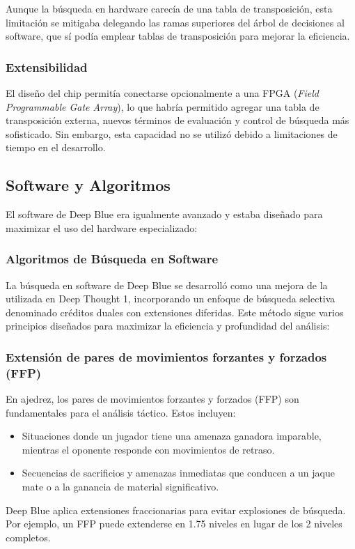 \documentclass[12pt,a4paper]{article}
\begin{document}
Aunque la búsqueda en hardware carecía de una tabla de transposición, esta limitación se mitigaba delegando las ramas superiores del árbol de decisiones al software, que sí podía emplear tablas de transposición para mejorar la eficiencia.

\subsubsection*{Extensibilidad}
El diseño del chip permitía conectarse opcionalmente a una FPGA (\textit{Field Programmable Gate Array}), lo que habría permitido agregar una tabla de transposición externa, nuevos términos de evaluación y control de búsqueda más sofisticado. Sin embargo, esta capacidad no se utilizó debido a limitaciones de tiempo en el desarrollo.


\subsection{Software y Algoritmos}
El software de Deep Blue era igualmente avanzado y estaba diseñado para maximizar el uso del hardware especializado:

\subsubsection{Algoritmos de Búsqueda en Software}

La búsqueda en software de Deep Blue se desarrolló como una mejora de la utilizada en Deep Thought 1, incorporando un enfoque de búsqueda selectiva denominado créditos duales con extensiones diferidas. Este método sigue varios principios diseñados para maximizar la eficiencia y profundidad del análisis:

\subsubsection*{Extensión de pares de movimientos forzantes y forzados (FFP)}
En ajedrez, los pares de movimientos forzantes y forzados (FFP) son fundamentales para el análisis táctico. Estos incluyen:
\begin{itemize}
    \item Situaciones donde un jugador tiene una amenaza ganadora imparable, mientras el oponente responde con movimientos de retraso.
    \item Secuencias de sacrificios y amenazas inmediatas que conducen a un jaque mate o a la ganancia de material significativo.
\end{itemize}
Deep Blue aplica extensiones fraccionarias para evitar explosiones de búsqueda. Por ejemplo, un FFP puede extenderse en 1.75 niveles en lugar de los 2 niveles completos.
\end{document}
